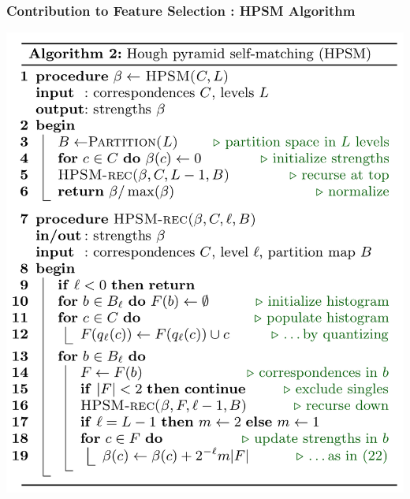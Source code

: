 \documentclass[11pt]{beamer}
\begin{document}
\begin{frame}
\frametitle{Contribution to Feature Selection : HPSM Algorithm}
\begin{center}
\includegraphics[scale=0.34]{algo2}
\end{center}
\end{frame}
\end{document}
